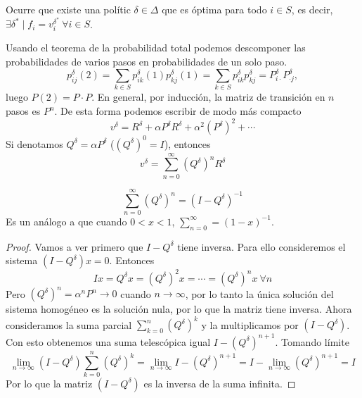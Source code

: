\documentclass[MIOP.tex]{subfiles}
\begin{document}
\begin{observacion}
Ocurre que existe una polític $\delta\in\Delta$ que es óptima para todo $i\in S$, es decir, $\exists \delta^*\mid f_i=v_i^{\delta^*}\ \forall i\in S$.
\end{observacion}
\begin{observacion}
Usando el teorema de la probabilidad total podemos descomponer las probabilidades de varios pasos en probabilidades de un solo paso.
$$p_{ij}^\delta(2)=\sum_{k\in S}p_{ik}^\delta(1)p_{kj}^\delta(1)=\sum_{k\in S}p_{ik}^\delta p_{kj}^\delta=P^\delta_{i\cdot}P^\delta_{\cdot j},$$
luego $P(2)=P\cdot P$. En general, por inducción, la matriz de transición en $n$ pasos es $P^n$. De esta forma podemos escribir de modo más compacto
$$v^\delta=R^\delta+ \alpha P^\delta R^\delta +\alpha^2 (P^\delta)^2+\cdots$$
Si denotamos $Q^\delta=\alpha P^\delta$ ($(Q^\delta)^0=I$), entonces
$$v^\delta=\sum_{n=0}^\infty (Q^\delta)^n R^\delta$$
\end{observacion}

\begin{lemma}
$$\sum_{n=0}^\infty (Q^\delta)^n=(I-Q^\delta)^{-1}$$
Es un análogo a que cuando $0<x<1$, $\sum_{n=0}^\infty=(1-x)^{-1}$. 
\end{lemma}
\begin{proof}
Vamos a ver primero que $I-Q^\delta$ tiene inversa. Para ello consideremos el sistema $(I-Q^\delta)x=0$. Entonces
$$Ix=Q^\delta x=(Q^\delta)^2x=\cdots=(Q^\delta)^nx\ \forall n$$
Pero $(Q^\delta)^n=\alpha^n P^n\to 0$ cuando $n\to\infty$, por lo tanto la única solución del sistema homogéneo es la solución nula, por lo que la matriz tiene inversa. Ahora consideramos la suma parcial $\sum_{k=0}^n (Q^\delta)^k$ y la multiplicamos por $(I-Q^\delta)$. Con esto obtenemos una suma telescópica igual $I-(Q^\delta)^{n+1}$. Tomando límite
$$\lim_{n\to\infty}(I-Q^\delta)\sum_{k=0}^n (Q^\delta)^k=\lim_{n\to\infty}I-(Q^\delta)^{n+1}=I-\lim_{n\to\infty}(Q^\delta)^{n+1}=I$$
Por lo que la matriz $(I-Q^\delta)$ es la inversa de la suma infinita.
\end{proof}
\end{document}
